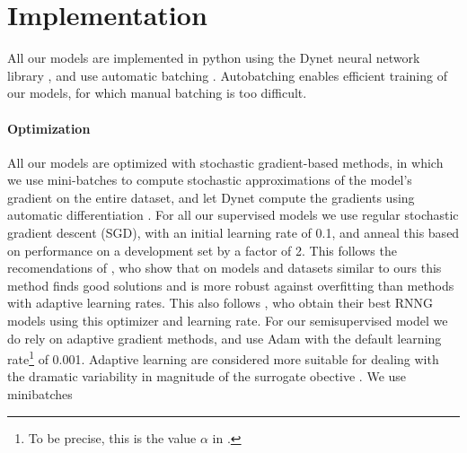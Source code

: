 \section{Implementation}
  All our models are implemented in python using the Dynet neural network library \citep{neubig2017dynet}, and use automatic batching \citep{neubig2017fly}. Autobatching enables efficient training of our models, for which manual batching is too difficult.

  \paragraph{Optimization}
  All our models are optimized with stochastic gradient-based methods, in which we use mini-batches to compute stochastic approximations of the model's gradient on the entire dataset, and let Dynet compute the gradients using automatic differentiation \citep{neubig2017dynet,baydin2018automatic}. For all our supervised models we use regular stochastic gradient descent (SGD), with an initial learning rate of 0.1, and anneal this based on performance on a development set by a factor of 2. This follows the recomendations of \citet{wilson2017marginal}, who show that on models and datasets similar to ours this method finds good solutions and is more robust against overfitting than methods with adaptive learning rates. This also follows \citet{dyer2016rnng}, who obtain their best RNNG models using this optimizer and learning rate. For our semisupervised model we do rely on adaptive gradient methods, and use Adam \citep{kingma2014adam} with the default learning rate\footnote{To be precise, this is the value $\alpha$ in \citet{kingma2014adam}.} of 0.001. Adaptive learning are considered more suitable for dealing with the dramatic variability in magnitude of the surrogate obective \citep{ranganath2014black,klein2018reinforce}. We use minibatches



